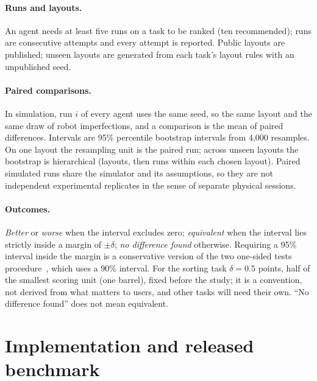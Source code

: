 \documentclass[11pt]{article}
\begin{document}
\paragraph{Runs and layouts.} An agent needs at least five runs on a task to be ranked (ten
recommended); runs are consecutive attempts and every attempt is reported. Public layouts are
published; unseen layouts are generated from each task's layout rules with an unpublished seed.

\paragraph{Paired comparisons.} In simulation, run $i$ of every agent uses the same seed, so the same
layout and the same draw of robot imperfections, and a comparison is the mean of paired differences.
Intervals are 95\% percentile bootstrap intervals from 4{,}000 resamples. On one layout the resampling
unit is the paired run; across unseen layouts the bootstrap is hierarchical (layouts, then runs within
each chosen layout). Paired simulated runs share the simulator and its assumptions, so they are not
independent experimental replicates in the sense of separate physical sessions.

\paragraph{Outcomes.} \emph{Better} or \emph{worse} when the interval excludes zero; \emph{equivalent}
when the interval lies strictly inside a margin of $\pm\delta$; \emph{no difference found} otherwise.
Requiring a 95\% interval inside the margin is a conservative version of the two one-sided tests
procedure~\cite{lakens2017}, which uses a 90\% interval. For the sorting task $\delta=0.5$ points, half
of the smallest scoring unit (one barrel), fixed before the study; it is a convention, not derived
from what matters to users, and other tasks will need their own. ``No difference found'' does not mean
equivalent.

\section{Implementation and released benchmark}\label{sec:impl}
\end{document}
